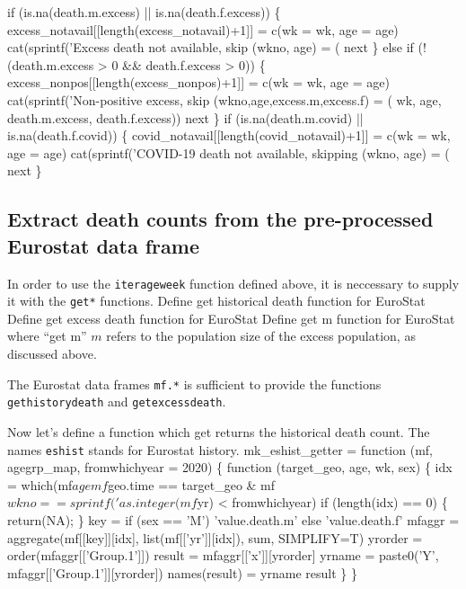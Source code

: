\documentclass{article}
\begin{document}
\nwenddocs{}\endmoddef
      if (is.na(death.m.excess) || is.na(death.f.excess)) \{
        excess_notavail[[length(excess_notavail)+1]] = c(wk = wk, age = age)
        cat(sprintf('Excess death not available, skip (wkno, age) = (%
        next
      \} else if (!(death.m.excess > 0 && death.f.excess > 0)) \{
        excess_nonpos[[length(excess_nonpos)+1]] = c(wk = wk, age = age)
        cat(sprintf('Non-positive excess, skip (wkno,age,excess.m,excess.f) = (%
                    wk, age, death.m.excess, death.f.excess))
        next
      \}
      if (is.na(death.m.covid) || is.na(death.f.covid)) \{
        covid_notavail[[length(covid_notavail)+1]] = c(wk = wk, age = age)
        cat(sprintf('COVID-19 death not available, skipping (wkno, age) = (%
        next
      \}
\nwendcode{}\nwdocspar

\subsection{Extract death counts from the pre-processed Eurostat data frame}

In order to use the {\tt{}iter{}ageweek} function defined above, it is neccessary to
supply it with the {\tt{}get{}*} functions.
\nwenddocs{}\plusendmoddef
\LA{}Define get historical death function for EuroStat\RA{}
\LA{}Define get excess death function for EuroStat\RA{}
\LA{}Define get m function for EuroStat\RA{}
\nwendcode{}\nwdocspar
where ``get m'' $m$ refers to the population size of the excess population, as discussed above.

The Eurostat data frames {\tt{}mf.*} is
sufficient to provide the functions {\tt{}get{}history{}death} and {\tt{}get{}excess{}death}.


Now let's define a function which get returns the historical death count. The names
{\tt{}eshist} stands for Eurostat history.
\nwenddocs{}\endmoddef
mk_eshist_getter = function (mf, agegrp_map, fromwhichyear = 2020) \{
    function (target_geo, age, wk, sex) \{
        idx = which(mf$age %
                    mf$geo.time == target_geo &
                    mf$wkno == sprintf('%
                    as.integer(mf$yr) < fromwhichyear)
        if (length(idx) == 0) \{ return(NA); \}
        key = if (sex == 'M') 'value.death.m' else 'value.death.f'
        mfaggr = aggregate(mf[[key]][idx], list(mf[['yr']][idx]),
                           sum, SIMPLIFY=T)
        yrorder = order(mfaggr[['Group.1']])
        result = mfaggr[['x']][yrorder]
        yrname = paste0('Y', mfaggr[['Group.1']][yrorder])
        names(result) = yrname
        result
    \}
\}
\nwendcode{}\nwdocspar
\end{document}
